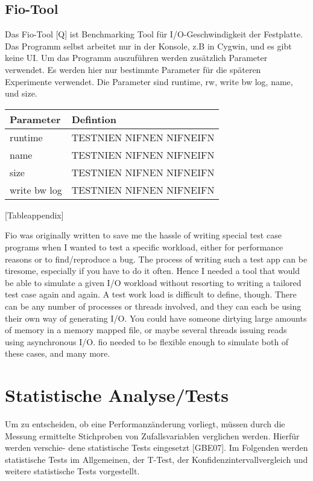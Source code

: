 \subsection{Fio-Tool}
Das Fio-Tool [Q] ist Benchmarking Tool für I/O-Geschwindigkeit der Festplatte.
Das Programm selbst arbeitet nur in der Konsole, z.B in Cygwin, und es gibt keine UI.
Um das Programm auszuführen werden zusätzlich Parameter verwendet. Es werden hier nur bestimmte Parameter 
für die späteren Experimente verwendet.
Die Parameter sind runtime, rw, write bw log, name, und size.


\begin{center}
\begin{tabularx}{\textwidth}{|X|X|}
  \hline
    Parameter& Defintion \\ 
  \hline
  runtime & TESTNIEN NIFNEN NIFNEIFN  \\ 
  \hline
  name &  TESTNIEN NIFNEN NIFNEIFN   \\ 
  \hline
  size &  TESTNIEN NIFNEN NIFNEIFN   \\ 
  \hline
  write bw log &  TESTNIEN NIFNEN NIFNEIFN   \\ 
  \hline
\end{tabularx}
\end{center}
[Tableappendix]

Fio was originally written to save me the hassle of writing special test case programs when I wanted to test a specific workload, 
either for performance reasons or to find/reproduce a bug. The process of writing such a test app can be tiresome, especially
 if you have to do it often. Hence I needed a tool that would be able to simulate a given 
I/O workload without resorting to writing a tailored test case again and again.
A test work load is difficult to define, though. There can be any number of processes or threads involved, 
and they can each be using their own way of generating I/O. You could have someone dirtying large amounts of memory in a memory mapped file,
 or maybe several threads issuing reads using asynchronous I/O. fio needed to be flexible enough to simulate both of these cases, and many more.

\section{Statistische Analyse/Tests}
Um zu entscheiden, ob eine Performanzänderung vorliegt, müssen durch die Messung
ermittelte Stichproben von Zufallsvariablen verglichen werden. Hierfür werden verschie-
dene statistische Tests eingesetzt [GBE07]. Im Folgenden werden statistische Tests im
Allgemeinen, der T-Test, der Konfidenzintervallvergleich und weitere statistische Tests
vorgestellt.

